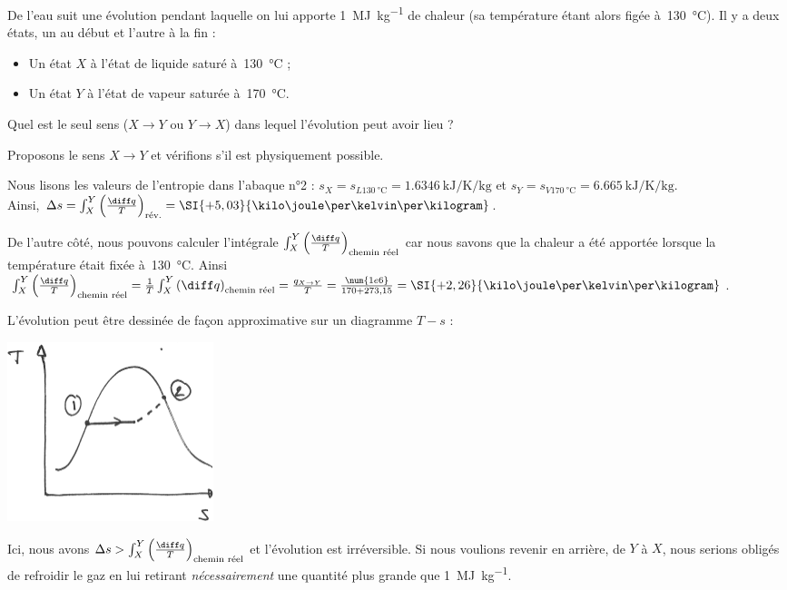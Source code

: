 		\begin{anexample}
			De l’eau suit une évolution pendant laquelle on lui apporte \SI{1}{\mega\joule\per\kilogram} de chaleur (sa température étant alors figée à~\SI{130}{\degreeCelsius}). Il y a deux états, un au début et l’autre à la fin :
				\begin{itemize}
					\item Un état $X$ à l’état de liquide saturé à~\SI{130}{\degreeCelsius} ;
					\item Un état $Y$ à l’état de vapeur saturée à~\SI{170}{\degreeCelsius}.
				\end{itemize}
			Quel est le seul sens ($X \to Y$ ou $Y \to X$) dans lequel l’évolution peut avoir lieu ?
						
				\begin{answer}
					Proposons le sens $X \to Y$ et vérifions s’il est physiquement possible.
					
					Nous lisons les valeurs de l’entropie dans l’abaque n°2 : $s_X = s_{L \SI{130}{\degreeCelsius}} = \SI{1,6346}{\kilo\joule\per\kelvin\per\kilogram}$ et $s_Y = s_{V \SI{170}{\degreeCelsius}} = \SI{6,665}{\kilo\joule\per\kelvin\per\kilogram}$. \\
					Ainsi, $\Delta s = \int_X^Y \left(\frac{\diff q}{T}\right)_\text{rév.} = \SI{+5,03}{\kilo\joule\per\kelvin\per\kilogram}$.
					
					De l’autre côté, nous pouvons calculer l’intégrale $\int_X^Y \left(\frac{\diff q}{T}\right)_\text{chemin réel}$ car nous savons que la chaleur a été apportée lorsque la température était fixée à~\SI{130}{\degreeCelsius}. Ainsi $\int_X^Y \left(\frac{\diff q}{T}\right)_\text{chemin réel} = \frac{1}{T} \int_X^Y \left(\diff q\right)_\text{chemin réel} = \frac{q_{X\to Y}}{T} = \frac{\num{1e6}}{170+273,15} = \SI{+2,26}{\kilo\joule\per\kelvin\per\kilogram}$.
					
					L’évolution peut être dessinée de façon approximative sur un diagramme $T-s$ :\\
						\begin{center}\includegraphics[width=6cm]{images/ts_example_8.png}\end{center}
					
					Ici, nous avons $\Delta s > \int_X^Y \left(\frac{\diff q}{T}\right)_\text{chemin réel}$ et l’évolution est irréversible. Si nous voulions revenir en arrière, de $Y$ à $X$, nous serions obligés de refroidir le gaz en lui retirant \emph{nécessairement} une quantité plus grande que \SI{1}{\mega\joule\per\kilogram}.
				
				\end{answer}
		\end{anexample}

